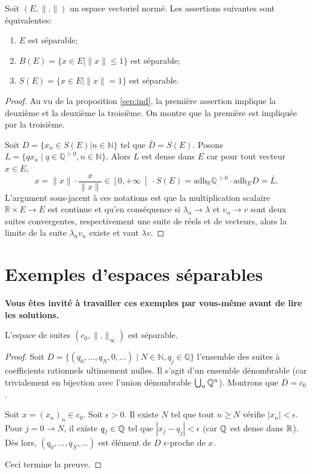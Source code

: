 \begin{prop}
  Soit $(E, \|.\|)$ un espace vectoriel normé. Les assertions suivantes sont
  équivalentes:
  \begin{enumerate}
  \item $E$ est séparable;
  \item $B(E) = \{x\in E\mid \|x\|\leq 1\}$ est séparable;
  \item $S(E) = \{x\in E\mid \|x\| =  1\}$ est séparable.
  \end{enumerate}
\end{prop}
\begin{proof}
  Au vu de la proposition \ref{sep:ind}, la première assertion implique
  la deuxième et la deuxième la troisième. On montre que la première
  est impliquée par la troisième.

  Soit $D = \{x_n \in S(E) | n\in\mathbb N\}$ tel que $\bar D = S(E)$.
  Posons $L = \{qx_n\mid q\in\mathbb Q^{>0}, n\in\mathbb N\}$. Alors $L$ est
  dense dans $E$ car pour tout vecteur $x\in E$,
  $$x = \|x\| \cdot \frac{x}{\|x\|}\in \left[0, +\infty \right[ \cdot S(E)
  = \mathrm{adh}_{\mathbb R}\mathbb Q^{>0}\cdot \mathrm{adh}_{E}D = \bar L.$$
  {L'argument sous-jacent à ces notations est que la multiplication
    scalaire $\mathbb R\times E\to E$ est continue et qu'en conséquence
    si $\lambda_n\to\lambda$ et $v_n\to v$ sont deux suites convergentes,
    respectivement une suite de réels et de vecteurs, alors la limite de
  la suite $\lambda_nv_n$ existe et vaut $\lambda v$}.
\end{proof}
\section{Exemples d'espaces séparables}
\textbf{Vous êtes invité à travailler ces exemples par vous-même avant de lire
les solutions.}
\begin{ex}
  L'espace de suites $(c_0, \|.\|_\infty)$ est séparable.
\end{ex}
\begin{proof}
  Soit $D = \{(q_0, \ldots, q_N, 0, \ldots)\mid
  N\in\mathbb N, q_j \in\mathbb Q\}$ l'ensemble des suites à coefficients
  rationnels ultimement nulles. Il s'agit d'un ensemble dénombrable
  (car trivialement en bijection avec l'union dénombrable $\bigcup_{n}\mathbb{Q}^n$).
  Montrons que $\bar D = c_0$.

  Soit $x = (x_n)_n\in c_0$.
  Soit $\epsilon > 0$. Il existe $N$ tel que tout $n\geq N$
  vérifie $|x_n|<\epsilon$. Pour $j = 0 \to N$, il existe $q_j\in \mathbb{Q}$ tel
  que $|x_j-q_j|<\epsilon$ (car $\mathbb{Q}$ est dense dans $\mathbb{R}$). Dès lors,
  $(q_0, \ldots, q_N, \ldots)$ est élément de $D$ $\epsilon$-proche de $x$.

  Ceci termine la preuve.
\end{proof}


